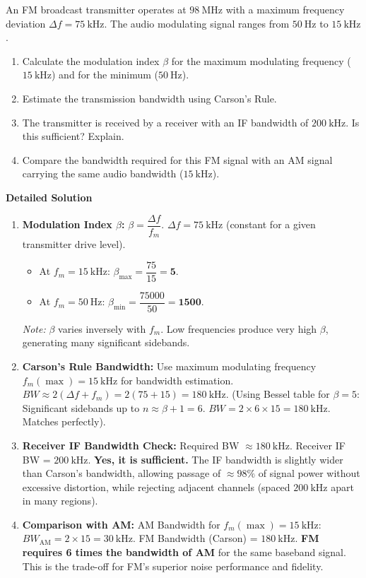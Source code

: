 \documentclass[11pt]{article}
\begin{document}
\begin{exoresolu}
An FM broadcast transmitter operates at $98\ \mathrm{MHz}$ with a maximum frequency deviation $\Delta f = 75\ \mathrm{kHz}$. The audio modulating signal ranges from $50\ \mathrm{Hz}$ to $15\ \mathrm{kHz}$.
\begin{enumerate}
\item Calculate the modulation index $\beta$ for the maximum modulating frequency ($15\ \mathrm{kHz}$) and for the minimum ($50\ \mathrm{Hz}$).
\item Estimate the transmission bandwidth using Carson's Rule.
\item The transmitter is received by a receiver with an IF bandwidth of $200\ \mathrm{kHz}$. Is this sufficient? Explain.
\item Compare the bandwidth required for this FM signal with an AM signal carrying the same audio bandwidth ($15\ \mathrm{kHz}$).
\end{enumerate}
\tcblower
\textbf{Detailed Solution}
\begin{enumerate}
\item \textbf{Modulation Index $\beta$:}
$\beta = \dfrac{\Delta f}{f_m}$. $\Delta f = 75\ \mathrm{kHz}$ (constant for a given transmitter drive level).
\begin{itemize}
\item At $f_m = 15\ \mathrm{kHz}$: $\beta_{\max} = \dfrac{75}{15} = \mathbf{5}$.
\item At $f_m = 50\ \mathrm{Hz}$: $\beta_{\min} = \dfrac{75000}{50} = \mathbf{1500}$.
\end{itemize}
\textit{Note:} $\beta$ varies inversely with $f_m$. Low frequencies produce very high $\beta$, generating many significant sidebands.

\item \textbf{Carson's Rule Bandwidth:}
Use maximum modulating frequency $f_m(\max) = 15\ \mathrm{kHz}$ for bandwidth estimation.
$BW \approx 2(\Delta f + f_m) = 2(75 + 15) = 180\ \mathrm{kHz}$.
(Using Bessel table for $\beta=5$: Significant sidebands up to $n \approx \beta+1 = 6$. $BW = 2 \times 6 \times 15 = 180\ \mathrm{kHz}$. Matches perfectly).

\item \textbf{Receiver IF Bandwidth Check:}
Required BW $\approx 180\ \mathrm{kHz}$. Receiver IF BW = $200\ \mathrm{kHz}$.
\textbf{Yes, it is sufficient.} The IF bandwidth is slightly wider than Carson's bandwidth, allowing passage of $\approx 98\%$ of signal power without excessive distortion, while rejecting adjacent channels (spaced $200\ \mathrm{kHz}$ apart in many regions).

\item \textbf{Comparison with AM:}
AM Bandwidth for $f_m(\max) = 15\ \mathrm{kHz}$: $BW_{\mathrm{AM}} = 2 \times 15 = 30\ \mathrm{kHz}$.
FM Bandwidth (Carson) = $180\ \mathrm{kHz}$.
\textbf{FM requires 6 times the bandwidth of AM} for the same baseband signal. This is the trade-off for FM's superior noise performance and fidelity.
\end{enumerate}
\end{exoresolu}
\end{document}
